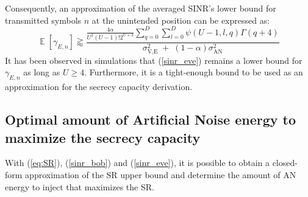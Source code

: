 \documentclass[conference]{IEEEtran}
\begin{document}
Consequently, an approximation of the averaged SINR's lower bound for transmitted symbols $n$ at the unintended position can be expressed as:
\begin{equation}
    \mathop{\mathbb{E}} \left[\gamma_{E,n}\right] \gtrapprox \frac{\frac{4\alpha}{U^2  (U-1)! 2^{U+3}} \sum_{q=0}^{D}\sum_{l=0}^{D} \psi(U-1,l,q)  \Gamma(q+4)}{\sigma^2_{\text{V,E}} \; + \; (1-\alpha) \sigma^2_{\text{AN}} }
    \label{sinr_eve}
\end{equation}
It has been observed in simulations that (\ref{sinr_eve}) remains a lower bound for $\gamma_{E,n}$ as long as $U\geq4$. Furthermore, it is a tight-enough bound to be used as an approximation for the secrecy capacity derivation.



\subsection{Optimal amount of Artificial Noise energy to maximize the secrecy capacity}
With (\ref{eq:SR}), (\ref{sinr_bob}) and (\ref{sinr_eve}), it is possible to obtain a closed-form approximation of the SR upper bound and determine the amount of AN energy to inject that maximizes the SR.
\end{document}

